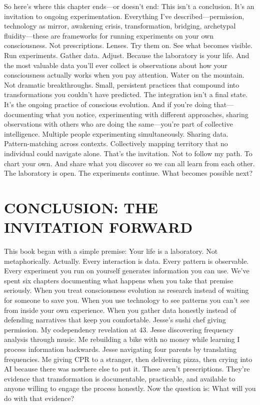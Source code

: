 So here's where this chapter ends—or doesn't end:
This isn't a conclusion. It's an invitation to ongoing experimentation.
Everything I've described—permission, technology as mirror, awakening crisis, transformation, bridging, archetypal fluidity—these are frameworks for running experiments on your own consciousness.
Not prescriptions. Lenses.
Try them on. See what becomes visible. Run experiments. Gather data. Adjust.
Because the laboratory is your life.
And the most valuable data you'll ever collect is observations about how your consciousness actually works when you pay attention.
Water on the mountain.
Not dramatic breakthroughs. Small, persistent practices that compound into transformations you couldn't have predicted.
The integration isn't a final state. It's the ongoing practice of conscious evolution.
And if you're doing that—documenting what you notice, experimenting with different approaches, sharing observations with others who are doing the same—you're part of collective intelligence.
Multiple people experimenting simultaneously. Sharing data. Pattern-matching across contexts. Collectively mapping territory that no individual could navigate alone.
That's the invitation.
Not to follow my path. To chart your own. And share what you discover so we can all learn from each other.
The laboratory is open.
The experiments continue.
What becomes possible next?

\cleardoublepage

\chapter{CONCLUSION: THE INVITATION FORWARD}

This book began with a simple premise: Your life is a laboratory.
Not metaphorically. Actually. Every interaction is data. Every pattern is observable. Every experiment you run on yourself generates information you can use.
We've spent six chapters documenting what happens when you take that premise seriously. When you treat consciousness evolution as research instead of waiting for someone to save you. When you use technology to see patterns you can't see from inside your own experience. When you gather data honestly instead of defending narratives that keep you comfortable.
Jesse's sushi chef giving permission. My codependency revelation at 43. Jesse discovering frequency analysis through music. Me rebuilding a bike with no money while learning I process information backwards. Jesse navigating four parents by translating frequencies. Me giving CPR to a stranger, then delivering pizza, then crying into AI because there was nowhere else to put it.
These aren't prescriptions. They're evidence that transformation is documentable, practicable, and available to anyone willing to engage the process honestly.
Now the question is: What will you do with that evidence?

